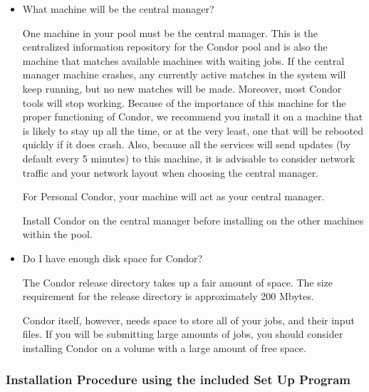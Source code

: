 \begin{itemize} 

\item{What machine will be the central manager?}

One machine in your pool must be the central manager.
This is the
centralized information repository for the Condor pool and is also the
machine that matches available machines with waiting
jobs.  If the central manager machine crashes, any currently active
matches in the system will keep running, but no new matches will be
made.  Moreover, most Condor tools will stop working.  Because of the
importance of this machine for the proper functioning of Condor, we
recommend you install it on a machine that is likely to stay up all the
time, or at the very least, one that will be rebooted quickly if it
does crash.  Also, because all the services will send updates (by
default every 5 minutes) to this machine, it is advisable to consider
network traffic and your network layout when choosing the central
manager.

For Personal Condor, your machine will act as your central manager.

Install Condor on the central manager before installing
on the other machines within the pool.

\item{Do I have enough disk space for Condor?}

The Condor release directory takes up a fair amount of space.
The size requirement for the release
directory is approximately 200 Mbytes.

Condor itself, however, needs space to store all of your jobs, and their
input files.  If you will be submitting large amounts of jobs,
you should consider installing Condor on a volume with a large amount
of free space.

\end{itemize}


\subsubsection{\label{sec:nt-install-procedure}
Installation Procedure using the included Set Up Program}

